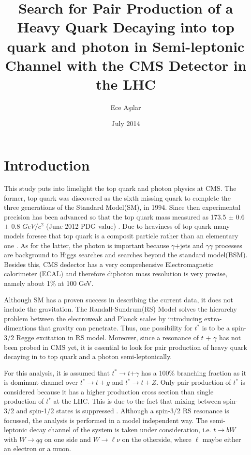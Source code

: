 \documentclass[12pt,oneandhalf,chaparabic,phys,ms,eng]{metu}
\author{Ece Aşılar}
\title{Search for Pair Production of a Heavy Quark Decaying into top quark and photon in Semi-leptonic Channel with the CMS Detector in the LHC}
\date{July 2014}
\begin{document}
\begin{preliminaries}

\end{preliminaries}
%
%
%
\chapter{Introduction}

This study puts into limelight the top quark and photon physics at CMS. The former, top quark was discovered as the sixth missing quark to complete the three generations of the Standard Model(SM), in 1994. Since then experimental precision has been advanced so that the top quark mass measured as 173.5 $\pm$ 0.6 $\pm$ 0.8 $GeV/ c^2$  (June 2012 PDG value) \cite{R24}.  Due to heaviness of top quark many models foresee that top quark is a composit particle rather than an elementary one \cite{R25,R29}. As for the latter, the photon is important because $\gamma$+jets and $\gamma$$\gamma$ processes are background to Higgs searches and searches beyond the standard model(BSM). Besides this, CMS dedector has a very comprehensive Electromagnetic calorimeter (ECAL) and therefore diphoton mass resolution is very precise, namely about 1$\%$ at 100 GeV.

Although SM has a proven success in describing the current data, it does not include the gravitation. The Randall-Sundrum(RS) \cite{R30,R31} Model solves the hierarchy problem between the electroweak and Planck scales by introducing extra-dimentions that gravity can penetrate. Thus, one possibility for $t^*$ is to be a spin-3/2 Regge excitation in RS model.
Moreover, since a resonance of $t$ + $\gamma$ has not been probed in CMS yet, it is essential to look for pair production of heavy quark decaying in to top quark and a photon semi-leptonically.

For this analysis, it is assumed that $t^*$$\rightarrow$$t$$+$$\gamma$ has a 100$\% $ branching fraction as it is dominant channel over  $t^*$$\rightarrow$$t+g$ and  $t^*$$\rightarrow$$t+Z$. Only pair production of $t^*$ is considered because it has a higher production cross section than single production of $t^*$ at the LHC. This is due to the fact that mixing between spin-3/2 and spin-1/2 states is suppressed \cite{R9}. Although a spin-3/2 RS resonance is focussed, the analysis is performed in a model independent way. The semi-leptonic decay channel of the system is taken under consideration, i.e. $t$$\rightarrow$$b$$W$ with $W$$\rightarrow$$q$$q$ on one side and $W$$\rightarrow$$\ell$$\nu$ on the otherside, where $\ell$ maybe either an electron or a muon.
\end{document}
